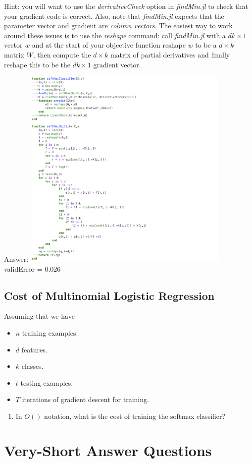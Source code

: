 \documentclass{article}
\def\ans#1{\par\gre{Answer: #1}}
\def\blu#1{{\color{blu}#1}}
\def\gre#1{{\color{gre}#1}}
\def\items#1{\begin{itemize}#1\end{itemize}}
\def\enum#1{\begin{enumerate}#1\end{enumerate}}
\begin{document}
Hint: you will want to use the \emph{derivativeCheck} option in \emph{findMin.jl} to check that your gradient code is correct. Also, note that \emph{findMin.jl} expects that the parameter vector and gradient are \emph{column vectors}. The easiest way to work around these issues is to use the \emph{reshape} command: call \emph{findMin.jl} with a $dk \times 1$ vector $w$ and at the start of your objective function reshape $w$ to be a $d \times k$ matrix $W$, then compute the $d \times k$ matrix of partial derivatives and finally reshape this to be the $dk \times 1$ gradient vector.
\ans{\includegraphics[width=10cm]{Q33Code.png} \\ validError = 0.026}
\subsection{Cost of Multinomial Logistic Regression}

Assuming that we have
\items{
\item $n$ training examples.
\item $d$ features.
\item $k$ classes.
\item $t$ testing examples.
\item $T$ iterations of gradient descent for training.
}
\blu{\enum{
\item In $O()$ notation, what is the cost of training the softmax classifier?
}}



\section{Very-Short Answer Questions}
\end{document}
